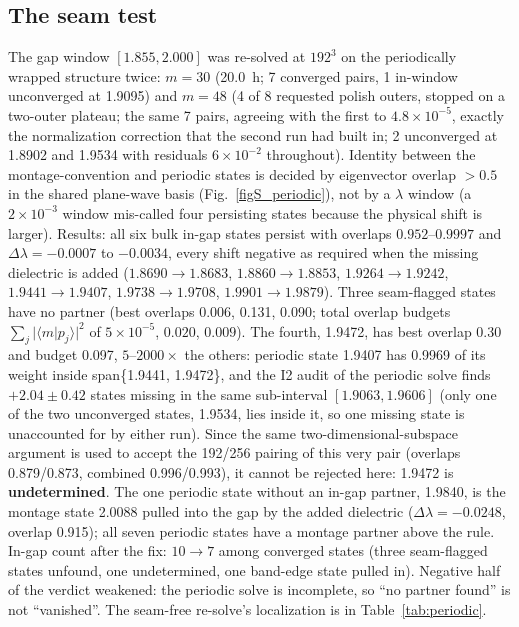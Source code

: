 \documentclass[aps,prl,preprint,superscriptaddress,longbibliography,nofootinbib]{revtex4-2}
\begin{document}
\subsection{The seam test}\label{sec:seam}
The gap window $[1.855,2.000]$ was re-solved at $192^3$ on the periodically wrapped structure twice: $m=30$ (20.0~h; 7 converged pairs, 1 in-window unconverged at 1.9095) and $m=48$ (4 of 8 requested polish outers, stopped on a two-outer plateau; the same 7 pairs, agreeing with the first to $4.8\times10^{-5}$, exactly the normalization correction that the second run had built in; 2 unconverged at 1.8902 and 1.9534 with residuals $6\times10^{-2}$ throughout). Identity between the montage-convention and periodic states is decided by eigenvector overlap $>0.5$ in the shared plane-wave basis (Fig.~\ref{figS_periodic}), not by a $\lambda$ window (a $2\times10^{-3}$ window mis-called four persisting states because the physical shift is larger). Results: all six bulk in-gap states persist with overlaps $0.952$--$0.9997$ and $\Delta\lambda=-0.0007$ to $-0.0034$, every shift negative as required when the missing dielectric is added ($1.8690\to1.8683$, $1.8860\to1.8853$, $1.9264\to1.9242$, $1.9441\to1.9407$, $1.9738\to1.9708$, $1.9901\to1.9879$). Three seam-flagged states have no partner (best overlaps 0.006, 0.131, 0.090; total overlap budgets $\sum_j|\langle m|p_j\rangle|^2$ of $5\times10^{-5}$, $0.020$, $0.009$). The fourth, 1.9472, has best overlap 0.30 and budget 0.097, $5$--$2000\times$ the others: periodic state 1.9407 has 0.9969 of its weight inside span\{1.9441, 1.9472\}, and the I2 audit of the periodic solve finds $+2.04\pm0.42$ states missing in the same sub-interval $[1.9063,1.9606]$ (only one of the two unconverged states, 1.9534, lies inside it, so one missing state is unaccounted for by either run). Since the same two-dimensional-subspace argument is used to accept the 192/256 pairing of this very pair (overlaps 0.879/0.873, combined 0.996/0.993), it cannot be rejected here: 1.9472 is \textbf{undetermined}. The one periodic state without an in-gap partner, 1.9840, is the montage state 2.0088 pulled into the gap by the added dielectric ($\Delta\lambda=-0.0248$, overlap 0.915); all seven periodic states have a montage partner above the rule. In-gap count after the fix: $10\to7$ among converged states (three seam-flagged states unfound, one undetermined, one band-edge state pulled in). Negative half of the verdict weakened: the periodic solve is incomplete, so ``no partner found'' is not ``vanished''. The seam-free re-solve's localization is in Table~\ref{tab:periodic}.
\end{document}
